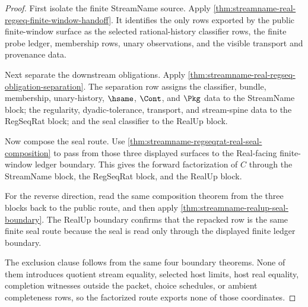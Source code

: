 \begin{proof}
First isolate the finite StreamName source. Apply
\autoref{thm:streamname-real-regseq-finite-window-handoff}. It identifies the
only rows exported by the public finite-window surface as the selected
rational-history classifier rows, the finite probe ledger, membership rows,
unary observations, and the visible transport and provenance data.

Next separate the downstream obligations. Apply
\autoref{thm:streamname-real-regseq-obligation-separation}. The separation row
assigns the classifier, bundle, membership, unary-history, $\hsame$, $\Cont$,
and $\Pkg$ data to the StreamName block; the regularity, dyadic-tolerance,
transport, and stream-spine data to the RegSeqRat block; and the seal
classifier to the RealUp block.

Now compose the seal route. Use
\autoref{thm:streamname-regseqrat-real-seal-composition} to pass from those
three displayed surfaces to the Real-facing finite-window ledger boundary.
This gives the forward factorization of $C$ through the StreamName block, the
RegSeqRat block, and the RealUp block.

For the reverse direction, read the same composition theorem from the three
blocks back to the public route, and then apply
\autoref{thm:streamname-realup-seal-boundary}. The RealUp boundary confirms
that the repacked row is the same finite seal route because the seal is read
only through the displayed finite ledger boundary.

The exclusion clause follows from the same four boundary theorems. None of
them introduces quotient stream equality, selected host limits, host real
equality, completion witnesses outside the packet, choice schedules, or ambient
completeness rows, so the factorized route exports none of those coordinates.
\end{proof}

